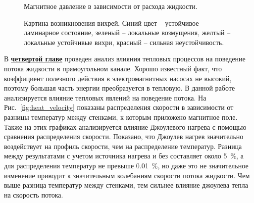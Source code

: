 \begin{figure}[h]
	\caption{Магнитное давление в зависимости от расхода жидкости.}
	\label{fig:pq_magnetic}
\end{figure}


\begin{figure}[h]
	\caption{Картина возникновения вихрей. Синий цвет -- устойчивое ламинарное состояние, зеленый -- локальные возмущения, желтый -- локальные устойчивые вихри, красный -- сильная неустойчивость.}
	\label{fig:map_instability}
\end{figure}



В \underline{\textbf{четвертой главе}} проведен анализ влияния тепловых процессов на поведение потока жидкости в прямоугольном канале. Хорошо известный факт, что коэффициент полезного действия в электромагнитных насосах не высокий, поэтому большая часть энергии преобразуется в тепловую. В данной работе анализируется влияние тепловых явлений на поведение потока. На Рис.~\ref{fig:heat_velocity} показаны распределения скорости в зависимости от разницы температур между стенками, к которым приложено магнитное поле. Также на этих графиках анализируется влияние Джоулевого нагрева с помощью сравнения распределения скорости. Показано, что Джоулев нагрев значительно воздействует на профиль скорости, чем на распределение температур. Разница между результатами с учетом источника нагрева и без составляет около 5~\%, а для распределения температур не превыше 0.01~\%, но даже это не значительное изменение приводит к значительным колебаниям скорости потока жидкости. Чем выше разница температур между стенками, тем сильнее влияние джоулева тепла на скорость потока. 

